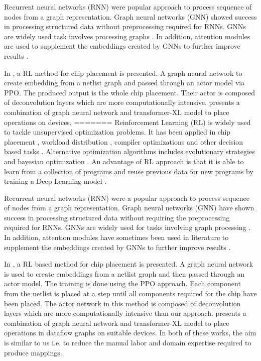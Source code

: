 Recurrent neural networks (RNN) \cite{hochreiter1996lstm} were popular approach to process sequence of nodes from a graph representation. 
Graph neural networks (GNN) \cite{gori2005new} showed success in processing structured data without preprocessing required for RNNs.
GNNs are widely used task involves processing graphs \cite{Zhou_compileGNN, zhou2019gdp}. 
In addition, attention modules are used to supplement the embeddings created by GNNs to further improve results \cite{addanki2019placeto}.

In \cite{mirhoseini2020chip}, a RL method for chip placement is presented. 
A graph neural network to create embedding from a netlist graph and passed through an actor model via PPO. 
The produced output is the whole chip placement. 
Their actor is composed of deconvolution layers which are more computationally intensive. 
\cite{zhou2019gdp} presents a combination of graph neural network and transformer-XL model to place operations on devices. 
=======
Reinforcement Learning (RL) is widely used to tackle unsupervised optimization problems. It has been applied in chip placement \cite{mirhoseini2020chip}, 
workload distribution \cite{Mirhoseini_placementRNN, addanki2019placeto, zhou2019gdp}, compiler optimizations \cite{Zhou_compileGNN} and 
other decision based tasks \cite{kormushev2013reinforcement, ZophL16_NASRL}. Alternative optimization algorithms includes 
evolutionary strategies \cite{Zhichao_ESNAS} and bayesian optimization \cite{shi2020learned}. An advantage of RL approach is that it is able to learn from a collection of programs and reuse previous data for new programs by training a Deep Learning model \cite{zhou2019gdp}.

Recurrent neural networks (RNN) \cite{hochreiter1996lstm} were a popular approach to process sequence of nodes from a graph representation. 
Graph neural networks (GNN) \cite{gori2005new} have shown success in processing structured data without requiring the preprocessing required for RNNs.
GNNs are widely used for tasks involving graph processing \cite{Zhou_compileGNN, zhou2019gdp}. 
In addition, attention modules have sometimes been used in literature to supplement the embeddings created by GNNs to further improve results \cite{addanki2019placeto}.

In \cite{mirhoseini2020chip}, a RL based method for chip placement is presented. A graph neural network is used to create embeddings from a netlist graph and then passed through an actor model. The training is done using the PPO approach. Each component from the netlist is placed at a step until all components required for the chip have been placed. The actor network in this method is composed of deconvolution layers which are more computationally intensive than our approach. 
\cite{zhou2019gdp} presents a combination of graph neural network and transformer-XL model to place operations in dataflow graphs on suitable devices.
In both of these works, the aim is similar to us i.e. to reduce the manual labor and domain expertise required to produce mappings.

